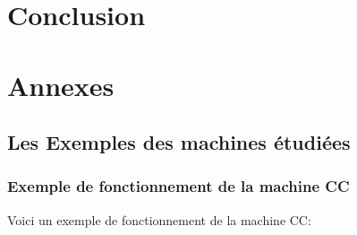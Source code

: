 \documentclass[10pt,a4paper]{article}
\begin{document}
		\section{Conclusion}
		
		\newpage
		
		\section{Annexes}
			\subsection{Les Exemples des machines étudiées}
				\subsubsection{Exemple de fonctionnement de la machine CC}\label{CC}
			
					Voici un exemple de fonctionnement de la machine CC:
					
\end{document}
